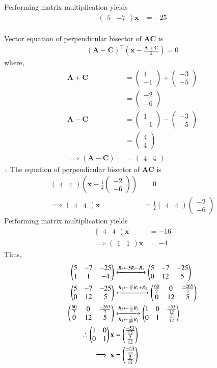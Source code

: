\documentclass[journal,12pt,twocolumn]{IEEEtran}
\theoremstyle{remark}
\newcommand{\myvec}[1]{\ensuremath{\begin{pmatrix}#1\end{pmatrix}}}
\providecommand{\brak}[1]{\ensuremath{\left(#1\right)}}
\let\vec\mathbf
\begin{document}
Performing matrix multiplication yields
\begin{align}
\myvec{5&-7}\vec{x}&=-25
\end{align}\\
Vector equation of perpendicular bisector of $\vec{AC}$ is
\begin{align}
(\vec{A}-\vec{C})^\top\brak{ \vec{x} - \frac{\vec{A}+\vec{C}}{2}} = 0
\end{align}
where,
\begin{align}
\vec{A}+\vec{C}&=\myvec{1\\-1}+\myvec{-3\\-5}\\
&=\myvec{-2\\-6}\\
\vec{A}-\vec{C} &= \myvec{1\\-1}-\myvec{-3\\-5}\\
&=\myvec{4\\4}\\
\implies (\vec{A}-\vec{C})^\top &= \myvec{4&4}
\end{align}
$\therefore $ The equation of perpendicular bisector of $\vec{AC}$ is
\begin{align}
\myvec{4&4}\brak{ \vec{x}-\frac{1}{2}\myvec{-2\\-6}}&=0\\
\implies \myvec{4&4}\vec{x}&=\frac{1}{2}\myvec{4&4}\myvec{-2\\-6}
\end{align}
Performing matrix multiplication yields
\begin{align}
\myvec{4&4}\vec{x}&=-16\\
\implies \myvec{1&1}\vec{x}&=-4
\end{align}
Thus,
\begin{align}
\myvec{5&-7&-25\\1&1&-4} &\xleftrightarrow[]{R_2 \leftarrow 5R_2 - R_1} \myvec{5&-7&-25\\0&12&5}\\
\myvec{5&-7&-25\\0&12&5} &\xleftrightarrow[]{R_1\leftarrow \frac{12}{7}R_1 + R_2} \myvec{\frac{60}{7}&0& \frac{-265}{7}\\0&12&5}\\
\myvec{\frac{60}{7}&0& \frac{-265}{7}\\0&12&5} &\xleftrightarrow[R_1\leftarrow \frac{7}{60}R_1]{R_2 \leftarrow \frac{1}{12}R_2} \myvec{1&0& \frac{-53}{12}\\0&1&\frac{5}{12}}\\
\therefore \myvec{1&0\\0&1}\vec{x} &= \myvec{\frac{-53}{12}\\\frac{5}{12}}\\
\implies \vec{x}&=\myvec{\frac{-53}{12}\\\frac{5}{12}}
\end{align}
\end{document}
